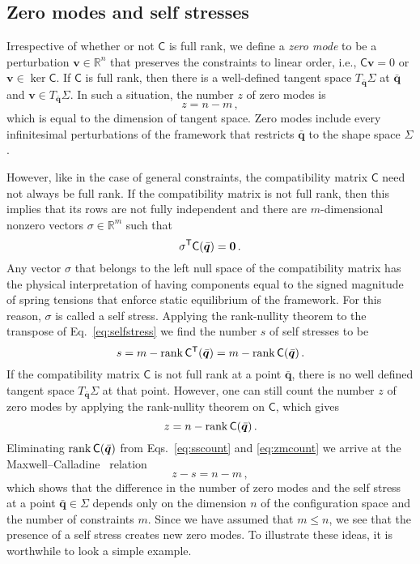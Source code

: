 \subsection{Zero modes and self stresses}

Irrespective of whether or not $\mathsf{C}$ is full rank, we define a \emph{zero mode} to be a perturbation $\bm{v} \in \mathbb{R}^n$ that preserves the constraints to linear order, i.e., $\mathsf{C}\bm{v} = 0$ or $\bm{v} \in \ker \mathsf{C}$.
If $\mathsf{C}$ is full rank, then there is a well-defined tangent space $T_{\bar{\bm{q}}}\Sigma$ at $\bar{\bm{q}}$ and $\bm{v} \in T_{\bar{\bm{q}}} \Sigma$.
In such a situation, the number $z$ of zero modes is
%
\begin{equation}
  z = n - m\,,
\end{equation}
%
which is equal to the dimension of tangent space.
Zero modes include every infinitesimal perturbations of the framework that restricts $\bar{\bm{q}}$ to the shape space $\Sigma$.

However, like in the case of general constraints, the compatibility matrix $\mathsf{C}$ need not always be full rank.
If the compatibility matrix is not full rank, then this implies that its rows are not fully independent and there are $m$-dimensional nonzero vectors $\sigma \in \mathbb{R}^m$ such that
\begin{equation}
  \sigma^\mathsf{T}\mathsf{C}(\bar{\bm{q}}) = \bm{0}\,.\label{eq:selfstress}
\end{equation}
Any vector $\sigma$ that belongs to the left null space of the compatibility matrix has the physical interpretation of having components equal to  the signed magnitude of spring tensions that enforce static equilibrium of the framework.
For this reason, $\sigma$ is called a self stress.
Applying the rank-nullity theorem to the transpose of Eq.~\eqref{eq:selfstress} we find the number $s$ of self stresses to be
\begin{equation}
  s = m - \operatorname{rank}{\mathsf{C}^\mathsf{T}(\bar{\bm{q}})} = m - \operatorname{rank}{\mathsf{C}(\bar{\bm{q}})}\,.\label{eq:sscount}
\end{equation}
If the compatibility matrix $\mathsf{C}$ is not full rank at a point $\bar{\bm{q}}$, there is no well defined tangent space $T_{\bar{\bm{q}}}\Sigma$ at that point.
However, one can still count the number $z$ of zero modes by applying the rank-nullity theorem on $\mathsf{C}$, which gives
\begin{equation}
  z = n - \operatorname{rank}{\mathsf{C}(\bar{\bm{q}})}\label{eq:zmcount}\,.
\end{equation}
Eliminating $\operatorname{rank}{\mathsf{C}(\bar{\bm{q}})}$ from Eqs.~\eqref{eq:sscount} and \eqref{eq:zmcount} we arrive at the Maxwell--Calladine~\cite{maxwell1864,calladine1978} relation
%
\begin{equation}
  z - s = n - m\,,\label{eq:mcindex}
\end{equation}
%
which shows that the difference in the number of zero modes and the self stress at a point $\bar{\bm{q}} \in \Sigma$ depends only on the dimension $n$ of the configuration space and the number of constraints $m$.
Since we have assumed that $m \leq n$, we see that the presence of a self stress creates new zero modes.
To illustrate these ideas, it is worthwhile to look a simple example.

